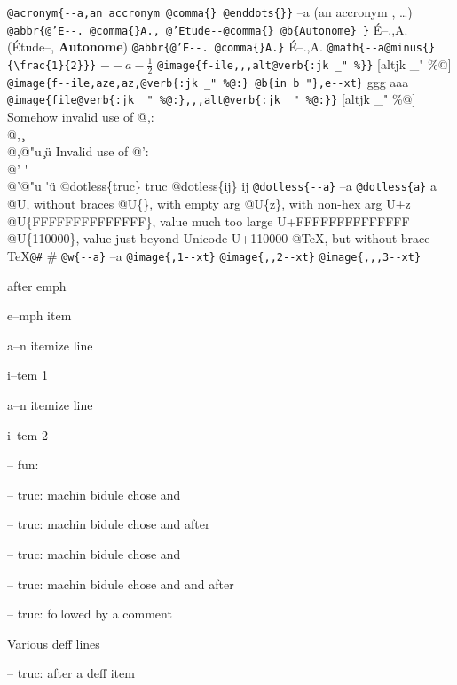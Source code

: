 \documentclass{book}
\begin{document}
\texttt{@acronym\{{-}{-}a,an accronym @comma\{\} @enddots\{\}\}} --a (an accronym , \dots{})
\texttt{@abbr\{@'E{-}{-}. @comma\{\}A., @'Etude{-}{-}@comma\{\} @b\{Autonome\} \}} \'{E}--.\@ ,A.\@ (\'{E}tude--, \textbf{Autonome})
\texttt{@abbr\{@'E{-}{-}. @comma\{\}A.\}} \'{E}--.\@ ,A.\@
\texttt{@math\{{-}{-}a@minus\{\} \{\textbackslash{}frac\{1\}\{2\}\}\}} $--a- {\frac{1}{2}}$
\texttt{@image\{f-ile,,,alt@verb\{:jk \_" \%\@\}\}} [altjk \_" \%@]
\texttt{@image\{f{-}{-}ile,aze,az,@verb\{:jk \_" \%@:\} @b\{in b "\},e{-}{-}xt\}} ggg
aaa
\texttt{@image\{file@verb\{:jk \_" \%@:\},,,alt@verb\{:jk \_" \%@:\}\}} [altjk \_" \%@]
Somehow invalid use of @,:\leavevmode{}\\
@, \c{}
\leavevmode{}\\
@,@"u \c{}\"{u}
Invalid use of @':\leavevmode{}\\
@' \'{}
\leavevmode{}\\
@'@"u \'{}\"{u}
@dotless\{truc\} truc
@dotless\{ij\} ij
\texttt{@dotless\{{-}{-}a\}} --a
\texttt{@dotless\{a\}} a
@U, without braces @U\{\}, with empty arg 
@U\{z\}, with non-hex arg U+z
@U\{FFFFFFFFFFFFFF\}, value much too large U+FFFFFFFFFFFFFF
@U\{110000\}, value just beyond Unicode U+110000
@TeX, but without brace \TeX{}\texttt{@\#} \#
\texttt{@w\{{-}{-}a\}} \hbox{--a}
\texttt{@image\{,1{-}{-}xt\}} 
\texttt{@image\{,,2{-}{-}xt\}} 
\texttt{@image\{,,,3{-}{-}xt\}} 


\emph{} after emph 

e--mph item




\textbullet{} a--n itemize line 

i--tem 1


\textbullet{} a--n itemize line 

i--tem 2




\hbox{}-- fun: 


\hbox{}-- truc: machin bidule chose and


\hbox{}-- truc: machin bidule chose and  after


\hbox{}-- truc: machin bidule chose and 


\hbox{}-- truc: machin bidule chose and and after


\hbox{}-- truc: followed by a comment


Various deff lines


\hbox{}-- truc: after a deff item
\end{document}
